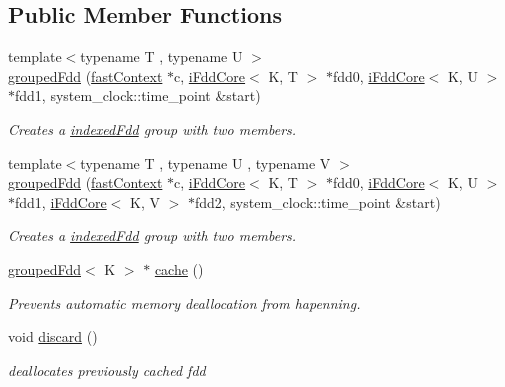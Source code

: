 \subsection*{Public Member Functions}
\begin{DoxyCompactItemize}
\item 
{\footnotesize template$<$typename T , typename U $>$ }\\\hyperlink{classfaster_1_1groupedFdd_a3e057f8351843ebf4b2875d3bb763ccb}{grouped\+Fdd} (\hyperlink{classfaster_1_1fastContext}{fast\+Context} $\ast$c, \hyperlink{classfaster_1_1iFddCore}{i\+Fdd\+Core}$<$ K, T $>$ $\ast$fdd0, \hyperlink{classfaster_1_1iFddCore}{i\+Fdd\+Core}$<$ K, U $>$ $\ast$fdd1, system\+\_\+clock\+::time\+\_\+point \&start)
\begin{DoxyCompactList}\small\item\em Creates a \hyperlink{classfaster_1_1indexedFdd}{indexed\+Fdd} group with two members. \end{DoxyCompactList}\item 
{\footnotesize template$<$typename T , typename U , typename V $>$ }\\\hyperlink{classfaster_1_1groupedFdd_a0f6bb764367d709b4837afcdf2cf0c30}{grouped\+Fdd} (\hyperlink{classfaster_1_1fastContext}{fast\+Context} $\ast$c, \hyperlink{classfaster_1_1iFddCore}{i\+Fdd\+Core}$<$ K, T $>$ $\ast$fdd0, \hyperlink{classfaster_1_1iFddCore}{i\+Fdd\+Core}$<$ K, U $>$ $\ast$fdd1, \hyperlink{classfaster_1_1iFddCore}{i\+Fdd\+Core}$<$ K, V $>$ $\ast$fdd2, system\+\_\+clock\+::time\+\_\+point \&start)
\begin{DoxyCompactList}\small\item\em Creates a \hyperlink{classfaster_1_1indexedFdd}{indexed\+Fdd} group with two members. \end{DoxyCompactList}\item 
\hyperlink{classfaster_1_1groupedFdd}{grouped\+Fdd}$<$ K $>$ $\ast$ \hyperlink{group__memmodel_gaf1256330323bf97826eaa01b0bb91bc1}{cache} ()
\begin{DoxyCompactList}\small\item\em Prevents automatic memory deallocation from hapenning. \end{DoxyCompactList}\item 
void \hyperlink{group__memmodel_gabfbee9b73e344e5fd6f44a209f6c1762}{discard} ()
\begin{DoxyCompactList}\small\item\em deallocates previously cached fdd \end{DoxyCompactList}\item 

\end{DoxyCompactItemize}
